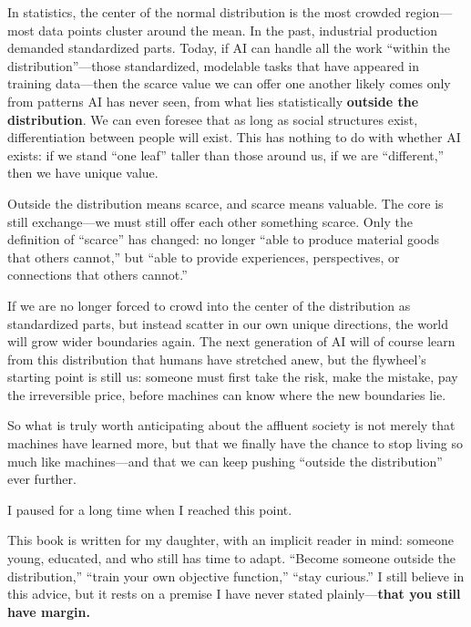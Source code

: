 \vspace{1em}

In statistics, the center of the normal distribution is the most crowded region---most data points cluster around the mean. In the past, industrial production demanded standardized parts. Today, if AI can handle all the work ``within the distribution''---those standardized, modelable tasks that have appeared in training data---then the scarce value we can offer one another likely comes only from patterns AI has never seen, from what lies statistically \textbf{outside the distribution}. We can even foresee that as long as social structures exist, differentiation between people will exist. This has nothing to do with whether AI exists: if we stand ``one leaf'' taller than those around us, if we are ``different,'' then we have unique value.

\vspace{1em}

Outside the distribution means scarce, and scarce means valuable.
The core is still exchange---we must still offer each other something scarce.
Only the definition of ``scarce'' has changed: no longer ``able to produce material goods that others cannot,'' but ``able to provide experiences, perspectives, or connections that others cannot.''

If we are no longer forced to crowd into the center of the distribution as standardized parts, but instead scatter in our own unique directions, the world will grow wider boundaries again. The next generation of AI will of course learn from this distribution that humans have stretched anew, but the flywheel's starting point is still us: someone must first take the risk, make the mistake, pay the irreversible price, before machines can know where the new boundaries lie.

So what is truly worth anticipating about the affluent society is not merely that machines have learned more, but that we finally have the chance to stop living so much like machines---and that we can keep pushing ``outside the distribution'' ever further.

I paused for a long time when I reached this point.

This book is written for my daughter, with an implicit reader in mind: someone young, educated, and who still has time to adapt. ``Become someone outside the distribution,'' ``train your own objective function,'' ``stay curious.''
I still believe in this advice, but it rests on a premise I have never stated plainly---\textbf{that you still have margin.}

